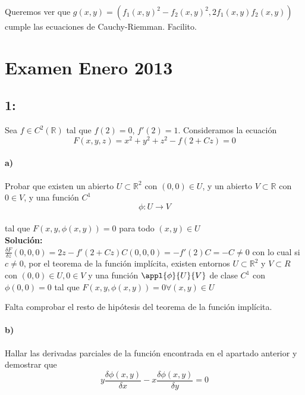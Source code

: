 \documentclass{apuntes}
\begin{document}
Queremos ver que $g(x,y) = (f_1(x,y)^2-f_2(x,y)^2,2f_1(x,y)f_2(x,y))$ cumple las ecuaciones de Cauchy-Riemman. Facilito.

\section{Examen Enero 2013}
\subsection{1:}

Sea $f\in C^2(\mathbb{R})$ tal que $f(2) = 0$, $f'(2)=1$. Consideramos la ecuación \\$$F(x,y,z) = x^2+y^2+z^2-f(2+Cz)=0$$

\paragraph{a)} Probar que existen un abierto $U\subset \mathbb{R}^2$ con $(0,0)\in U$, y un abierto $V\subset \mathbb{R}$ con $0\in V$, y una función $C^1$\\$$\phi: U \rightarrow V$$\\tal que $F(x, y, \phi (x, y)) = 0$ para todo $(x,y) \in U$\\

\textbf{Solución:}\\
$\frac{\delta F}{\delta z}(0,0,0) = 2z - f'(2+Cz)C (0,0,0) =-f'(2)C = -C \neq 0$
con lo cual si $c\neq 0$, por el teorema de la función implícita, existen entornos $U\subset \mathbb{R}^2$ y $V\subset{R}$ con $(0,0)\in U, 0\in V$ y una función $\appl{\phi}{U}{V}$ de clase $C^1$ con $\phi (0,0) = 0$ tal que $F(x,y,\phi (x,y)) = 0 \forall (x,y)\in U$

Falta comprobar el resto de hipótesis del teorema de la función implícita.

\paragraph{b)} Hallar las derivadas parciales de la función encontrada en el apartado anterior y demostrar que \\

$$y\frac{\delta \phi (x,y)}{\delta x} - x\frac{\delta \phi (x,y)}{\delta y} = 0$$
\end{document}
